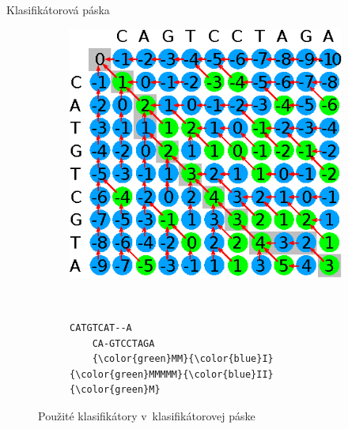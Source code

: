 \documentclass[xcolor=dvipsnames, compress, 12pt]{beamer}
\theoremstyle{definition}
\begin{document}
\begin{frame}[fragile]{Klasifikátorová páska}
\begin{figure}[htp]
    \centering
    \begin{subfigure}[m]{0.5\textwidth}
    \centering
    \includegraphics[width=\textwidth]{images/clf_tape}
    \end{subfigure}
    ~
    \begin{subfigure}[m]{0.3\textwidth}
    \centering
    \begin{BVerbatim}[commandchars=\\\{\}]
    CATGTCAT--A
    CA-GTCCTAGA
    {\color{green}MM}{\color{blue}I}{\color{green}MMMMM}{\color{blue}II}{\color{green}M}
    \end{BVerbatim}
    \end{subfigure}
    \caption{Použité klasifikátory v~klasifikátorovej páske}
    \label{fig:clf-tape}
\end{figure}
\end{frame}
\end{document}
